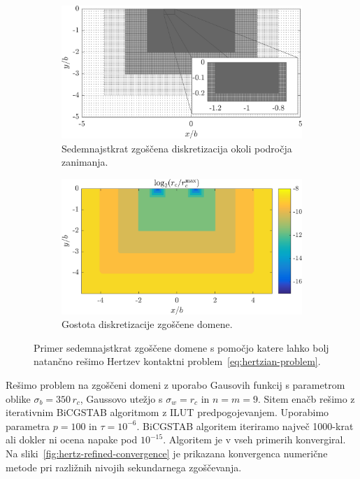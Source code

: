 \documentclass[12pt,a4paper,twoside]{article}
\theoremstyle{definition} %
\theoremstyle{plain} %
\numberwithin{equation}{section}
\begin{document}
\begin{figure}[h]
  \centering
  \begin{subfigure}[t]{0.45\textwidth}
    \includegraphics[width=\textwidth]{images/hertzian_refined_domain.png}
    \caption[Sedemnajstkrat zgoščena diskretizacija.]{Sedemnajstkrat zgoščena diskretizacija okoli področja zanimanja.}
    \label{fig:hertz-refined-domain}
  \end{subfigure}
  \begin{subfigure}[t]{0.45\textwidth}
    \includegraphics[width=\textwidth]{images/hertzian_refined_domain_density.png}
    \caption{Gostota diskretizacije zgoščene domene.}
    \label{fig:hertz-refined-domain-density}
  \end{subfigure}
  \caption[Primer zgoščene domene s katero rešujemo Hertzev kontaktni
  problem.]{Primer sedemnajstkrat zgoščene domene s pomočjo katere lahko
  bolj natančno rešimo Hertzev kontaktni problem~\eqref{eq:hertzian-problem}.}
  \label{fig:hertz-refined-domain-together}
\end{figure}

Rešimo problem na zgoščeni domeni z uporabo Gausovih funkcij s parametrom oblike $\sigma_b = 350\,
r_c$, Gaussovo utežjo s $\sigma_w = r_c$ in $n = m = 9$. Sitem enačb rešimo z iterativnim
BiCGSTAB algoritmom z ILUT predpogojevanjem. Uporabimo parametra $p=100$ in $\tau = 10^{-6}$.
BiCGSTAB algoritem iteriramo največ 1000-krat ali dokler ni ocena napake pod $10^{-15}$.
Algoritem je v vseh primerih konvergiral. Na sliki~\ref{fig:hertz-refined-convergence} je prikazana
konvergenca numerične metode pri razližnih nivojih sekundarnega zgoščevanja.
\end{document}
